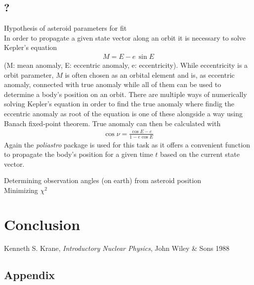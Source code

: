 \documentclass[11pt, a4paper]{article}
\numberwithin{equation}{section}
\begin{document}
\subsection{?}
Hypothesis of asteroid parameters for fit\\
In order to propagate  a given state vector along an orbit it is necessary to solve Kepler's equation
\begin{align}
	M = E - e\, \sin E
\end{align}
(M: mean anomaly, E: eccentric anomaly, e: eccentricity).
While eccentricity is a orbit parameter, $M$ is often chosen as an orbital element and is, as eccentric anomaly, connected with true anomaly while all of them can be used to determine a body's position on an orbit.
There are multiple ways of numerically solving Kepler's equation in order to find the true anomaly where findig the eccentric anomaly as root of the equation is one of these alongside a way using Banach fixed-point theorem.
True anomaly can then be calculated with
\begin{align}
\cos\nu = \frac{\cos E - e}{1 - e \cos E}
\end{align}
Again the \emph{poliastro} package is used for this task as it offers a convenient function to propagate the body's position for a given time $t$ based on the current state vector.

Determining observation angles (on earth) from asteroid position\\
Minimizing $\chi^2$




\section{Conclusion}


\FloatBarrier
\vspace{\fill}
\begin{thebibliography}{19}

	Kenneth S. Krane,
	\emph{Introductory Nuclear Physics},
	John Wiley \& Sons 1988

\end{thebibliography}

\begin{appendix}
\section{Appendix}

\end{appendix}
\end{document}
